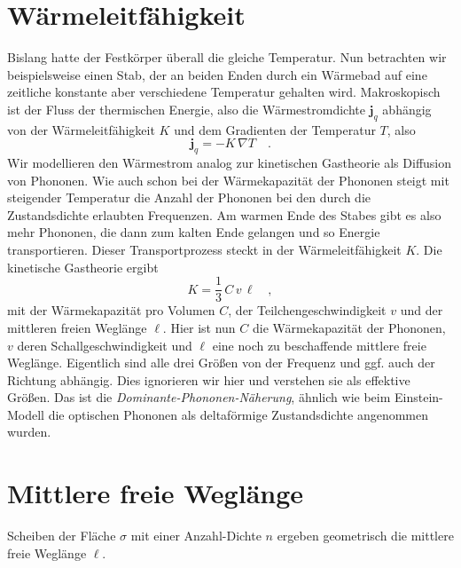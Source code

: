 \section*{Wärmeleitfähigkeit}

 Bislang hatte der Festkörper überall die gleiche Temperatur. Nun betrachten wir beispielsweise einen Stab, der an beiden Enden durch ein Wärmebad auf eine zeitliche konstante aber verschiedene Temperatur gehalten wird. Makroskopisch ist der Fluss der thermischen Energie, also die Wärmestromdichte $\mathbf{j}_q$ abhängig von der Wärmeleitfähigkeit $K$ und dem Gradienten der Temperatur $T$, also
\begin{equation}
    \mathbf{j}_q = - K \, \nabla T \quad .
\end{equation}
Wir modellieren den Wärmestrom analog zur kinetischen Gastheorie  als Diffusion von Phononen. Wie auch schon bei der Wärmekapazität der Phononen steigt mit steigender Temperatur die Anzahl der Phononen bei den durch die Zustandsdichte erlaubten Frequenzen. Am warmen Ende des Stabes gibt es also mehr Phononen, die dann zum kalten Ende gelangen und so Energie transportieren. Dieser Transportprozess steckt in der Wärmeleitfähigkeit $K$. Die kinetische Gastheorie  ergibt
\begin{equation}
    K  = \frac{1}{3} \, C \, v \, \ell \quad , \label{eq:2_def_waermeleitf}
\end{equation}
mit der Wärmekapazität pro Volumen $C$, der Teilchengeschwindigkeit $v$ und der mittleren freien Weglänge $\ell$. Hier ist nun $C$ die Wärmekapazität der Phononen, $v$ deren Schallgeschwindigkeit und $\ell$ eine noch zu beschaffende mittlere freie Weglänge. Eigentlich sind alle drei Größen von der Frequenz und ggf. auch der Richtung abhängig. Dies ignorieren wir hier und verstehen sie als effektive Größen. Das ist die \emph{Dominante-Phononen-Näherung}, ähnlich wie beim Einstein-Modell die optischen Phononen als deltaförmige Zustandsdichte angenommen wurden.



\section*{Mittlere freie Weglänge}

\begin{marginfigure}
    \caption{Scheiben der Fläche $\sigma$ mit einer Anzahl-Dichte $n$ ergeben geometrisch die mittlere freie Weglänge $\ell$.}
     \label{fig:1_crosssection}
\end{marginfigure}

